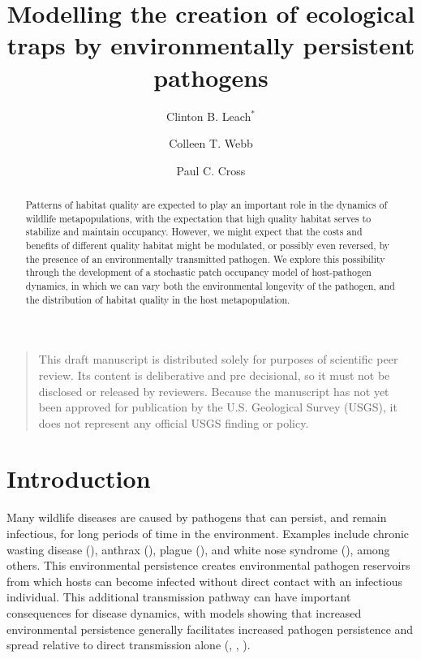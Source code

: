 \documentclass{article}
\begin{document}
\title{Modelling the creation of ecological traps by environmentally persistent pathogens}

\author[1]{Clinton B. Leach$^*$}
\author[1]{Colleen T. Webb}
\author[2]{Paul C. Cross}


\maketitle


\begin{quote}
This draft manuscript is distributed solely for purposes of scientific peer review.  Its content is deliberative and pre decisional, so it must not be disclosed or released by reviewers.  Because the manuscript has not yet been approved for publication by the U.S. Geological Survey (USGS), it does not represent any official USGS finding or policy.
\end{quote}



\begin{abstract} 
Patterns of habitat quality are expected to play an important role in the dynamics of wildlife metapopulations, with the expectation that high quality habitat serves to stabilize and maintain occupancy.  However, we might expect that the costs and benefits of different quality habitat might be modulated, or possibly even reversed, by the presence of an environmentally transmitted pathogen.  We explore this possibility through the development of a stochastic patch occupancy model of host-pathogen dynamics, in which we can vary both the environmental longevity of the pathogen, and the distribution of habitat quality in the host metapopulation.
\end{abstract}

\section{Introduction}
\label{intro}

Many wildlife diseases are caused by pathogens that can persist, and remain infectious, for long periods of time in the environment.  Examples include chronic wasting disease (\cite{Miller2006}), anthrax (\cite{Dragon1995}), plague (\cite{Eisen2008}), and white nose syndrome (\cite{Lindner2011}), among others.  This environmental persistence creates environmental pathogen reservoirs from which hosts can become infected without direct contact with an infectious individual.  This additional transmission pathway can have important consequences for disease dynamics, with models showing that increased environmental persistence generally facilitates increased pathogen persistence and spread relative to direct transmission alone (\cite{Almberg2011}, \cite{Sharp2011}, \cite{Breban2009}). 
\end{document}
